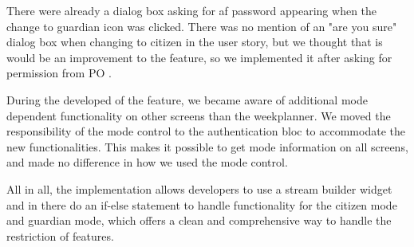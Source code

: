 There were already a dialog box asking for af password appearing when the change to guardian icon was clicked. There was no mention of an "are you sure" dialog box when changing to citizen in the user story, but we thought that is would be an improvement to the feature, so we implemented it after asking for permission from \gls{PO} .

During the developed of the feature, we became aware of additional mode dependent functionality on other screens than the weekplanner.  We moved the responsibility of the mode control to the authentication \gls{bloc} to accommodate the new functionalities. This makes it possible to get mode information on all screens, and made no difference in how we used the mode control. 

All in all, the implementation allows developers to use a stream builder widget and in there do an if-else statement to handle functionality for the citizen mode and guardian mode, which offers a clean and comprehensive way to handle the restriction of features.
